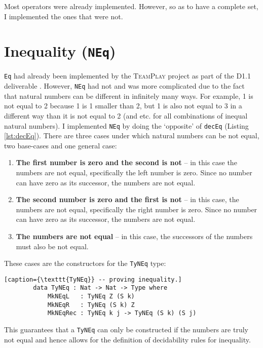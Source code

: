        Most operators were already implemented. However, so as to have a complete set, I implemented the ones that were not.

\section{Inequality (\texttt{NEq})}
    \texttt{Eq} had already been implemented by the \textsc{TeamPlay} project as part of the D1.1 deliverable \cite{teamplay:d1.1}. However, \texttt{NEq} had not and was more complicated due to the fact that natural numbers can be different in infinitely many ways. For example, 1 is not equal to 2 because 1 is 1 smaller than 2, but 1 is also not equal to 3 in a different way than it is not equal to 2 (and etc. for all combinations of inequal natural numbers). I implemented \texttt{NEq} by doing the `opposite' of \texttt{decEq} (Listing \ref{lst:decEq}). There are three cases under which natural numbers can be not equal, two base-cases and one general case:
    \begin{enumerate}
        \item \textbf{The first number is zero and the second is not} -- in this case the numbers are not equal, specifically the left number is zero. Since no number can have zero as its successor, the numbers are not equal.
        \item \textbf{The second number is zero and the first is not} -- in this case, the numbers are not equal, specifically the right number is zero. Since no number can have zero as its successor, the numbers are not equal.
        \item \textbf{The numbers are not equal} -- in this case, the successors of the numbers must also be not equal.
    \end{enumerate}
    These cases are the constructors for the \texttt{TyNEq} type:
    \begin{lstlisting}[caption={\texttt{TyNEq}} -- proving inequality.]
        data TyNEq : Nat -> Nat -> Type where
            MkNEqL   : TyNEq Z (S k)
            MkNEqR   : TyNEq (S k) Z
            MkNEqRec : TyNEq k j -> TyNEq (S k) (S j)
    \end{lstlisting}
    This guarantees that a \texttt{TyNEq} can only be constructed if the numbers are truly not equal and hence allows for the definition of decidability rules for inequality.
